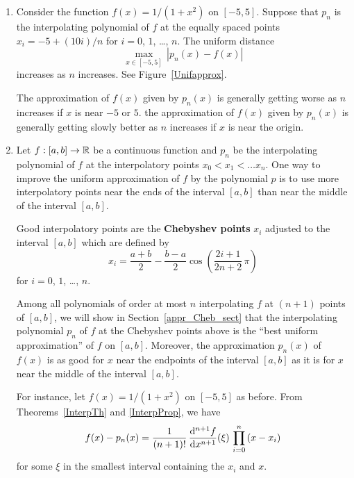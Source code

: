 \begin{rmkList}
\begin{enumerate}
\item Consider the function $f(x) = 1/(1+x^2)$ on $[-5,5]$.  Suppose
that $p_n$ is the interpolating polynomial of $f$ at the equally
spaced points $x_i = -5 + (10i)/n$ for $i=0$, $1$, \ldots, $n$.
The uniform distance
\[
\max_{x \in [-5,5]}\,|p_n(x) - f(x)|
\]
increases as $n$ increases.  See Figure~\ref{Unifapprox}.

The approximation of $f(x)$ given by $p_n(x)$ is generally getting
worse as $n$ increases if $x$ is near $-5$ or $5$.  the approximation
of $f(x)$ given by $p_n(x)$ is generally getting slowly better as $n$
increases if $x$ is near the origin.


\item \label{appr_interp_rmk_lbl} Let $f:[a,b] \rightarrow \mathbb{R}$ be a
continuous function and $p_n$ be the interpolating polynomial of $f$ at the
interpolatory points $x_0 < x_1 < \ldots x_n$.  One way to improve the
uniform approximation of $f$ by the polynomial $p$ is to use more
interpolatory points near the ends of the interval $[a,b]$ than near the
middle of the interval $[a,b]$.

Good interpolatory points are the
{\bfseries Chebyshev points} $x_i$ adjusted to
the interval $[a,b]$ which are defined by
\[
x_i = \frac{a+b}{2} - \frac{b-a}{2}\cos\left(\frac{2i+1}{2n+2}\,\pi\right)
\]
for $i=0$, $1$, \ldots , $n$.

Among all polynomials of order at most $n$ interpolating $f$ at $(n+1)$
points of $[a,b]$, we will show in Section~\ref{appr_Cheb_sect} that the
interpolating polynomial $p_n$ of $f$ at the Chebyshev points above is
the ``best uniform approximation'' of $f$ on $[a,b]$.
Moreover, the approximation $p_n(x)$ of $f(x)$ is as good for $x$ near
the endpoints of the interval $[a,b]$ as it is for $x$ near the middle of
the interval $[a,b]$.

For instance, let $f(x) = 1/(1+x^2)$ on $[-5,5]$ as before.
From Theorems~\ref{InterpTh} and \ref{InterpProp}, we have
\[
f(x) - p_n(x) =
\frac{1}{(n+1)!}\,\frac{\mathrm{d}^{n+1}{f}}{\mathrm{d}{x}^{n+1}}(\xi) \, \prod_{i=0}^n\,(x-x_i)
\]
for some $\xi$ in the smallest interval containing the $x_i$ and $x$.


\end{enumerate}
\end{rmkList}
